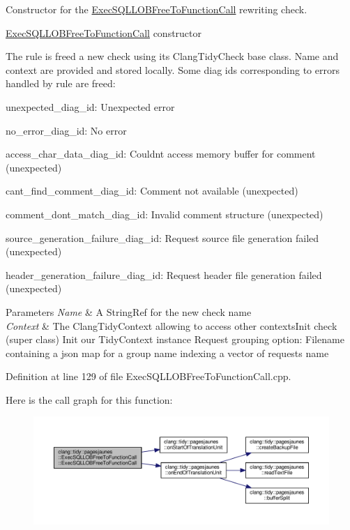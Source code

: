 Constructor for the \hyperlink{classclang_1_1tidy_1_1pagesjaunes_1_1_exec_s_q_l_l_o_b_free_to_function_call}{Exec\+S\+Q\+L\+L\+O\+B\+Free\+To\+Function\+Call} rewriting check. 

\hyperlink{classclang_1_1tidy_1_1pagesjaunes_1_1_exec_s_q_l_l_o_b_free_to_function_call}{Exec\+S\+Q\+L\+L\+O\+B\+Free\+To\+Function\+Call} constructor

The rule is freed a new check using its {\ttfamily Clang\+Tidy\+Check} base class. Name and context are provided and stored locally. Some diag ids corresponding to errors handled by rule are freed\+:
\begin{DoxyItemize}
\item unexpected\+\_\+diag\+\_\+id\+: Unexpected error
\item no\+\_\+error\+\_\+diag\+\_\+id\+: No error
\item access\+\_\+char\+\_\+data\+\_\+diag\+\_\+id\+: Couldn\textquotesingle{}t access memory buffer for comment (unexpected)
\item cant\+\_\+find\+\_\+comment\+\_\+diag\+\_\+id\+: Comment not available (unexpected)
\item comment\+\_\+dont\+\_\+match\+\_\+diag\+\_\+id\+: Invalid comment structure (unexpected)
\item source\+\_\+generation\+\_\+failure\+\_\+diag\+\_\+id\+: Request source file generation failed (unexpected)
\item header\+\_\+generation\+\_\+failure\+\_\+diag\+\_\+id\+: Request header file generation failed (unexpected)
\end{DoxyItemize}


\begin{DoxyParams}{Parameters}
{\em Name} & A String\+Ref for the new check name \\
\hline
{\em Context} & The Clang\+Tidy\+Context allowing to access other contexts\+Init check (super class) Init our Tidy\+Context instance Request grouping option\+: Filename containing a json map for a group name indexing a vector of requests name \\
\hline
\end{DoxyParams}


Definition at line 129 of file Exec\+S\+Q\+L\+L\+O\+B\+Free\+To\+Function\+Call.\+cpp.

Here is the call graph for this function\+:
\nopagebreak
\begin{figure}[H]
\begin{center}
\leavevmode
\includegraphics[width=350pt]{classclang_1_1tidy_1_1pagesjaunes_1_1_exec_s_q_l_l_o_b_free_to_function_call_a191d57a9b724f7d5baa73b2a2ca30189_cgraph}
\end{center}
\end{figure}



